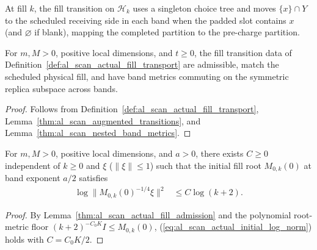 \begin{definition}
    \label{def:al_scan_actual_fill_transport}
    \leanok
    At fill $k$, the fill transition on $\mathcal H_k$ uses a singleton choice
    tree and moves $\{x\}\cap Y$ to the scheduled receiving side in each band
    when the padded slot contains $x$ (and $\varnothing$ if blank), mapping the
    completed partition to the pre-charge partition.
\end{definition}

\begin{lemma}
    \label{thm:al_scan_actual_fill_admission}
    \leanok
    For $m,M>0$, positive local dimensions, and $t\ge0$, the fill transition
    data of Definition~\ref{def:al_scan_actual_fill_transport} are admissible,
    match the scheduled physical fill, and have band metrics commuting on the
    symmetric replica subspace across bands.
\end{lemma}
\begin{proof}\leanok
    Follows from Definition~\ref{def:al_scan_actual_fill_transport},
    Lemma~\ref{thm:al_scan_augmented_transitions}, and
    Lemma~\ref{thm:al_scan_nested_band_metrics}.
\end{proof}

\begin{lemma}
    \label{thm:al_scan_actual_initial_log_norm}
    \leanok
    For $m,M>0$, positive local dimensions, and $a>0$, there exists $C\ge0$
    independent of $k\ge0$ and $\xi$ ($\|\xi\|\le1$) such that the initial fill
    root $M_{0,k}(0)$ at band exponent $a/2$ satisfies
    \begin{align}
        \log\|M_{0,k}(0)^{-1/4}\xi\|^2 & \le C\log(k+2).
        \label{eq:al_scan_actual_initial_log_norm}
    \end{align}
\end{lemma}
\begin{proof}\leanok
    By Lemma~\ref{thm:al_scan_actual_fill_admission} and the polynomial
    root-metric floor $(k+2)^{-C_0K}I\le M_{0,k}(0)$,
    (\ref{eq:al_scan_actual_initial_log_norm}) holds with $C=C_0K/2$.
\end{proof}

